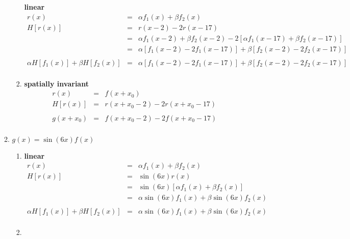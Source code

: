 \documentclass[9pt]{article}
\begin{document}
\begin{enumerate}
\begin{enumerate}
\begin{enumerate}
            \textbf{linear}
            \begin{eqnarray*}
              r(x) &=& \alpha f_1(x) + \beta f_2(x) \\
              H[r(x)] &=& r(x-2) - 2r(x-17) \\
                      &=& \alpha f_1(x-2) + \beta f_2(x-2) -
                          2[\alpha f_1(x-17) + \beta f_2(x-17)] \\
                      &=& \alpha [f_1(x-2) - 2f_1(x-17)] +
                          \beta [f_2(x-2) - 2f_2(x-17)] \\
              \\
              \alpha H[f_1(x)] + \beta H[f_2(x)]
                      &=& \alpha [f_1(x-2) - 2f_1(x-17)] +
                          \beta [f_2(x-2) - 2f_2(x-17)] \\
            \end{eqnarray*}
          \item
            \textbf{spatially invariant}
            \begin{eqnarray*}
              r(x) &=& f(x + x_0) \\
              H[r(x)] &=& r(x + x_0 - 2) - 2r(x + x_0 - 17) \\
              \\
              g(x + x_0) &=& f(x + x_0 - 2) - 2f(x + x_0 - 17) \\
            \end{eqnarray*}
          \end{enumerate}
        \item
          $ g(x) = \sin(6x) f(x) $
          \begin{enumerate}
          \item
            \textbf{linear}
            \begin{eqnarray*}
              r(x) &=& \alpha f_1(x) + \beta f_2(x) \\
              H[r(x)] &=& \sin(6x) r(x) \\
                      &=& \sin(6x) [\alpha f_1(x) + \beta f_2(x)] \\
                      &=& \alpha \sin(6x) f_1(x) + \beta \sin(6x) f_2(x) \\
              \\
              \alpha H[f_1(x)] + \beta H[f_2(x)]
                      &=& \alpha \sin(6x) f_1(x) + \beta \sin(6x) f_2(x) \\
            \end{eqnarray*}
          \item

\end{enumerate}
\end{enumerate}
\end{enumerate}
\end{document}
